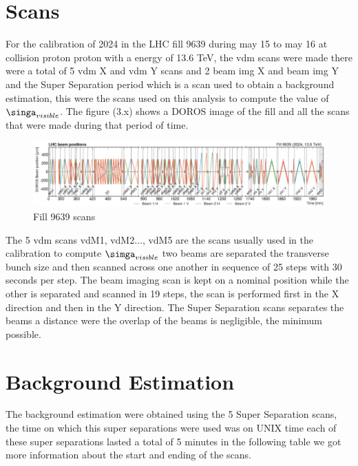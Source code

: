 \section{Scans}

For the calibration of 2024 in the LHC fill 9639 during may 15 to may 16 at collision proton proton with a energy of 13.6 TeV, the vdm scans were made there were a total of 5 vdm X and vdm Y scans and 2 beam img X and beam img Y and the Super Separation period which is a scan used to obtain a background estimation, this were the scans used on this analysis to compute the value of $\singa_{visible}$. The figure (3.x) shows a DOROS image of the fill and all the scans that were made during that period of time. 

\begin{figure}[h]
    \centering
    \includegraphics[width=1\textwidth, height=0.4\textheight]{scans.png}
    \caption{Fill 9639 scans}
    \label{fig:scans}
\end{figure}

The 5 vdm scans vdM1, vdM2..., vdM5 are the scans usually used in the calibration to compute $\simga_{visible}$ two beams are separated the transverse bunch size and then scanned across one another in sequence of 25 steps with 30 seconds per step. The beam imaging scan is kept on a nominal position while the other is separated and scanned in 19 steps, the scan is performed first in the X direction and then in the Y direction. The Super Separation scans separates the beams a distance were the overlap of the beams is negligible, the minimum possible.


\section{Background Estimation}

The background estimation were obtained using the 5 Super Separation scans, the time on which this super separations were used was on UNIX time each of these super separations lasted a total of 5 minutes in the following table we got more information about the start and ending of the scans. 

